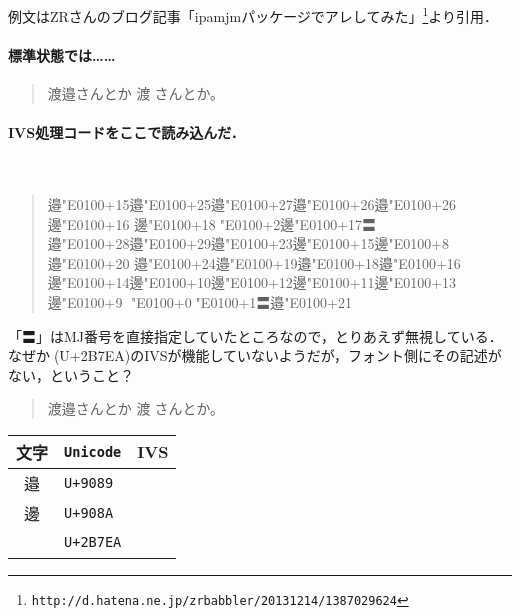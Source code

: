 \documentclass{ltjsarticle}
\def\MJI[#1]#2{#2\char\numexpr "E0100+#1\relax}%
\def\IVSL#1{\directlua{ivs.list_ivs('#1')}}
\begin{document}

例文はZRさんのブログ記事「ipamjmパッケージでアレしてみた」\footnote{%
\verb+http://d.hatena.ne.jp/zrbabbler/20131214/1387029624+}より引用．

\paragraph{標準状態では……}
\begin{quote}
\LARGE
渡邉󠄏さんとか   %
渡𫟪󠄂さんとか。%
\end{quote}

\paragraph{IVS処理コードをここで読み込んだ．}\ 

\begin{quote}
\LARGE
\MJI[15]{邉}\MJI[25]{邉}\MJI[27]{邉}\MJI[26]{邉}\MJI[26]{邉}\MJI[16]{邊}
\MJI[18]{邊}\MJI[2]{𫟪}\MJI[17]{邊}〓\\
\MJI[28]{邉}\MJI[29]{邉}\MJI[23]{邉}\MJI[15]{邊}\MJI[8]{邊}\MJI[20]{邉}
\MJI[24]{邉}\MJI[19]{邉}\MJI[18]{邉}\MJI[16]{邉}\\
\MJI[14]{邊}\MJI[10]{邊}\MJI[12]{邊}\MJI[11]{邊}\MJI[13]{邊}\MJI[9]{邊}
\MJI[0]{𫟪}\MJI[1]{𫟪}〓\MJI[21]{邉}
\end{quote}
「〓」はMJ番号を直接指定していたところなので，とりあえず無視している．
なぜか𫟪(U+2B7EA)のIVSが機能していないようだが，フォント側にその記述がない，ということ？

\begin{quote}
\LARGE
渡邉󠄏さんとか   %
渡𫟪󠄂さんとか。%
\end{quote}

\begin{center}
\Large
\begin{tabular}{c>{\tt}ll}
\toprule
文字&Unicode&IVS\\
\midrule
邉&U+9089&\IVSL{邉}\\
邊&U+908A&\IVSL{邊}\\
𫟪&U+2B7EA&\IVSL{𫟪}\\
\bottomrule
\end{tabular}
\end{center}
\end{document}
